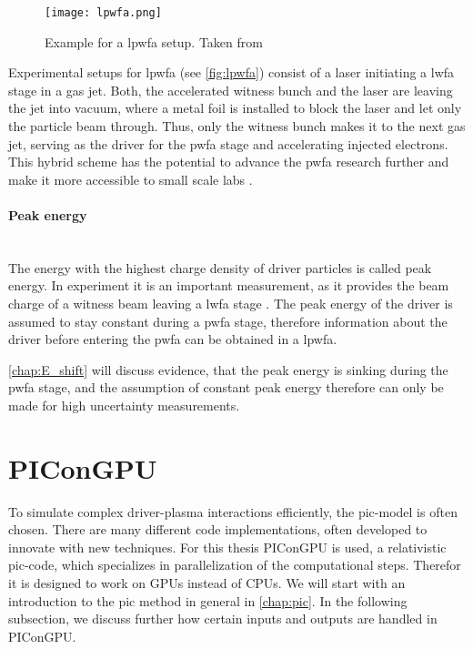 \documentclass[bachelor_thesis]{subfiles}
\begin{document}
\begin{figure}
	\centering
	\texttt{[image: lpwfa.png]}
	\caption{Example for a \gls{lpwfa} setup. Taken from \cite{Ossa2019}}
	\label{fig:lpwfa} 
\end{figure} 
Experimental setups for \gls{lpwfa} (see \autoref{fig:lpwfa}) consist of a laser initiating a \gls{lwfa} stage in a gas jet. 
Both, the accelerated witness bunch and the laser are leaving the jet into vacuum, where a metal foil is installed to block the laser and let only the particle beam through. 
Thus, only the witness bunch makes it to the next gas jet, serving as the driver for the \gls{pwfa} stage and accelerating injected electrons.
This hybrid scheme has the potential to advance the \gls{pwfa} research further and make it more accessible to small scale labs \cite{Kurz2021}.

\paragraph*{Peak energy}\hspace{0pt} \\
The energy with the highest charge density of driver particles is called peak energy. In experiment it is an important measurement, as it provides the beam charge of a witness beam leaving a \gls{lwfa} stage \cite{Schoebel2022}.
The peak energy of the driver is assumed to stay constant during a \gls{pwfa} stage, therefore information about the driver before entering the \gls{pwfa} can be obtained in a \gls{lpwfa}.

\autoref{chap:E_shift} will discuss evidence, that the peak energy is sinking during the \gls{pwfa} stage, and the assumption of constant peak energy therefore can only be made for high uncertainty measurements.


\section{PIConGPU}
To simulate complex driver-plasma interactions efficiently, the \acrfull{pic}-model is often chosen. There are many different code implementations, often developed to innovate with new techniques. For this thesis PIConGPU \cite{PIConGPU2013, PICRepo} is used, 
a relativistic \gls{pic}-code, which specializes in parallelization of the computational steps. Therefor it is designed to work on GPUs instead of CPUs. We will start with an introduction to the \gls{pic} method in general in \autoref{chap:pic}.
In the following subsection, we discuss further how certain inputs and outputs are handled in PIConGPU.
\end{document}
